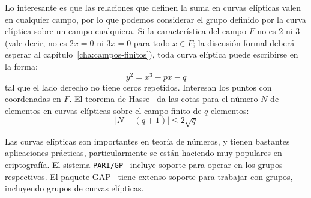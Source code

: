   Lo interesante es que las relaciones
  que definen la suma en curvas elípticas
  valen en cualquier campo,
  por lo que podemos considerar
  el grupo definido por la curva elíptica sobre un campo cualquiera.
  Si la característica del campo \(F\) no es \(2\) ni \(3\)
  (vale decir,
   no es \(2 x = 0\) ni \(3 x = 0\) para todo \(x \in F\);
   la discusión formal deberá esperar
   al capítulo~\ref{cha:campos-finitos}),
  toda curva elíptica puede escribirse en la forma:
  \begin{equation*}
    y^2
      = x^3 - p x - q
  \end{equation*}
  tal que el lado derecho no tiene ceros repetidos.
  Interesan los puntos con coordenadas en \(F\).
  El teorema de Hasse~%
    \cite{hasse36:_EC-I, hasse36:_EC-II, hasse36:_EC-III}
  da las cotas para el número \(N\) de elementos en curvas elípticas
  sobre el campo finito de \(q\) elementos:
  \begin{equation*}
    \lvert N - (q + 1) \rvert
      \le 2 \sqrt{q}
  \end{equation*}

  Las curvas elípticas son importantes en teoría de números,
  y tienen bastantes aplicaciones prácticas,
  particularmente se están haciendo muy populares en criptografía.%
  El sistema \texttt{PARI/GP}~\cite{PARI:2.7.2}%
  incluye soporte para operar en los grupos respectivos.
  El paquete GAP~%
    \cite{GAP:4.7.5}%
  tiene extenso soporte para trabajar con grupos,
  incluyendo grupos de curvas elípticas.

